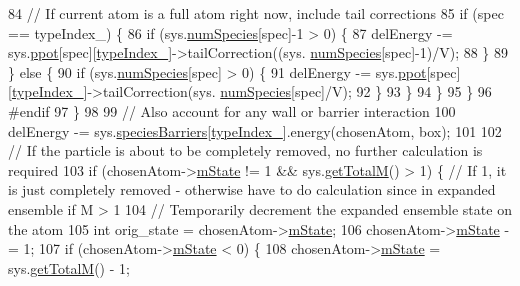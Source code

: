 \begin{DoxyCode}
84                 \textcolor{comment}{// If current atom is a full atom right now, include tail corrections}
85                 \textcolor{keywordflow}{if} (spec == typeIndex\_) \{
86                     \textcolor{keywordflow}{if} (sys.\hyperlink{classsim_system_a9eea865e6dc1cff377b1e79c4d9c23f0}{numSpecies}[spec]-1 > 0) \{
87                         delEnergy -= sys.\hyperlink{classsim_system_ad2e290b5963f132e6a3a56cee35c8e9f}{ppot}[spec][\hyperlink{classmc_move_acb731965547b0326ef318ec96da8b46a}{typeIndex\_}]->tailCorrection((sys.
      \hyperlink{classsim_system_a9eea865e6dc1cff377b1e79c4d9c23f0}{numSpecies}[spec]-1)/V);
88                     \}
89                 \} \textcolor{keywordflow}{else} \{
90                     \textcolor{keywordflow}{if} (sys.\hyperlink{classsim_system_a9eea865e6dc1cff377b1e79c4d9c23f0}{numSpecies}[spec] > 0) \{
91                         delEnergy -= sys.\hyperlink{classsim_system_ad2e290b5963f132e6a3a56cee35c8e9f}{ppot}[spec][\hyperlink{classmc_move_acb731965547b0326ef318ec96da8b46a}{typeIndex\_}]->tailCorrection(sys.
      \hyperlink{classsim_system_a9eea865e6dc1cff377b1e79c4d9c23f0}{numSpecies}[spec]/V);
92                     \}
93                 \}
94             \}
95         \}
96 \textcolor{preprocessor}{#endif}
97 \textcolor{preprocessor}{}    \}
98 
99     \textcolor{comment}{// Also account for any wall or barrier interaction}
100     delEnergy -= sys.\hyperlink{classsim_system_a5ae652ff4519f39c3862abae32a9581b}{speciesBarriers}[\hyperlink{classmc_move_acb731965547b0326ef318ec96da8b46a}{typeIndex\_}].energy(chosenAtom, box);
101 
102     \textcolor{comment}{// If the particle is about to be completely removed, no further calculation is required}
103     \textcolor{keywordflow}{if} (chosenAtom->\hyperlink{classatom_a3cb00c0c5b7533657e05af6ff4a42740}{mState} != 1 && sys.\hyperlink{classsim_system_aa4ad1afff101bb530e1590df05035276}{getTotalM}() > 1) \{ \textcolor{comment}{// If 1, it is just completely
       removed - otherwise have to do calculation since in expanded ensemble if M > 1}
104         \textcolor{comment}{// Temporarily decrement the expanded ensemble state on the atom}
105         \textcolor{keywordtype}{int} orig\_state = chosenAtom->\hyperlink{classatom_a3cb00c0c5b7533657e05af6ff4a42740}{mState};
106         chosenAtom->\hyperlink{classatom_a3cb00c0c5b7533657e05af6ff4a42740}{mState} -= 1;
107         \textcolor{keywordflow}{if} (chosenAtom->\hyperlink{classatom_a3cb00c0c5b7533657e05af6ff4a42740}{mState} < 0) \{
108             chosenAtom->\hyperlink{classatom_a3cb00c0c5b7533657e05af6ff4a42740}{mState} = sys.\hyperlink{classsim_system_aa4ad1afff101bb530e1590df05035276}{getTotalM}() - 1;

\end{DoxyCode}
